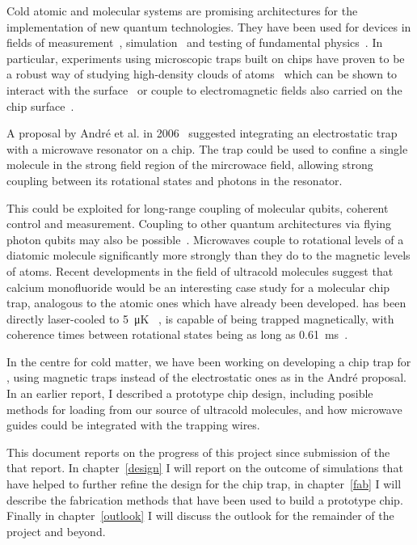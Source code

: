 Cold atomic and molecular systems are promising architectures for the
implementation of new quantum technologies. They have been used for devices in
fields of measurement~\cite{PhysRevLett.120.103201}, simulation~\cite{Gross995}
and testing of fundamental physics~\cite{DeMille990}.  In particular,
experiments using microscopic traps built on chips have proven to be a robust
way of studying high-density clouds of atoms~\cite{Reichel1999, Ott2001} which
can be shown to interact with the surface~\cite{FOLMAN2002263} or couple to electromagnetic
fields also carried on the chip surface~\cite{Treutlein2008, Sewell_2010}.
%

A proposal by Andr\'e et al. in 2006~\cite{Andre2006} suggested integrating an
electrostatic trap with a microwave resonator on a chip. The trap could be used
to confine a single molecule in the strong field region of the mircrowace
field, allowing strong coupling between its rotational states and photons in
the resonator.


This could be exploited for long-range coupling of molecular
qubits, coherent control and measurement. Coupling to other quantum
architectures via flying photon qubits may also be
possible~\cite{PhysRevLett.92.063601}.
Microwaves couple to rotational levels of a diatomic molecule
significantly more strongly 
than they do to the magnetic levels of atoms.
Recent developments in the field of ultracold molecules suggest that calcium
monofluoride would be an interesting case study for a molecular chip trap,
analogous to the atomic ones which have already been developed. \CaF{} has been
directly laser-cooled to \SI{5}{\micro\kelvin} ~\cite{PhysRevLett.123.033202}, is capable of being
trapped magnetically, with coherence times between rotational states
being as long as
\SI{0.61}{\milli\second}~\cite{Blackmore_2018}. 

In the centre for cold matter, we have been working on developing a chip trap
for \CaF{}, using magnetic traps instead of the electrostatic ones as in the
Andr\'e proposal. In an earlier report, I described a prototype chip design,
including posible methods for loading from our source of ultracold molecules,
and how microwave guides could be integrated with the trapping wires.

This document reports on the progress of this project since submission of the
that report.  In chapter~\ref{design} I will report on the outcome of
simulations that have helped to further refine the design for the chip trap, in
chapter~\ref{fab} I will describe the fabrication methods that have been used
to build a prototype chip. Finally in chapter~\ref{outlook} I will discuss the
outlook for the remainder of the project and beyond.


